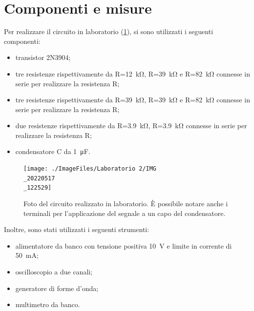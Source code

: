 \section{Componenti e misure}
Per realizzare il circuito in laboratorio (\Fig\ref{fig:emitterfollwer_v2_circuito}), si sono utilizzati i seguenti componenti:
\begin{itemize}
	\item transistor 2N3904;
	\item tre resistenze rispettivamente da R=\SI{12}{\kilo\ohm}, R=\SI{39}{\kilo\ohm} e R=\SI{82}{\kilo\ohm} connesse in serie per realizzare la resistenza R;
	\item tre resistenze rispettivamente da R=\SI{39}{\kilo\ohm}, R=\SI{39}{\kilo\ohm} e R=\SI{82}{\kilo\ohm} connesse in serie per realizzare la resistenza R;
	\item due resistenze rispettivamente da R=\SI{3.9}{\kilo\ohm}, R=\SI{3.9}{\kilo\ohm} connesse in serie per realizzare la resistenza R;
	\item condensatore C da \SI{1}{\micro\farad}.
\end{itemize}
\begin{figure}[h!]
	\centering
	\texttt{[image: ./ImageFiles/Laboratorio 2/IMG\\\_20220517\\\_122529]}
	\caption{Foto del circuito realizzato in laboratorio. \`E possibile notare anche i terminali per l'applicazione del segnale a un capo del condensatore.}
	\label{fig:emitterfollwer_v2_circuito}
\end{figure}

\noindent
Inoltre, sono stati utilizzati i seguenti strumenti:
\begin{itemize}
	\item alimentatore da banco con tensione positiva \SI{10}{\volt} e limite in corrente di \SI{50}{\milli\ampere};
	\item oscilloscopio a due canali;
	\item generatore di forme d'onda;
	\item multimetro da banco.
\end{itemize}

